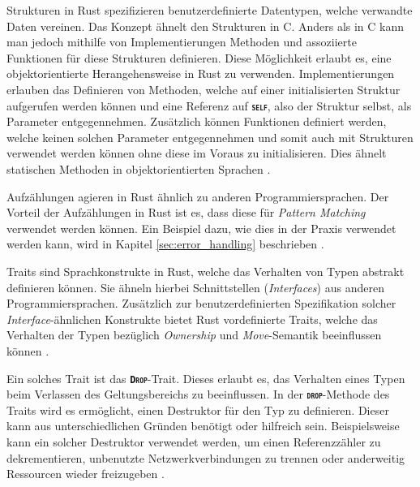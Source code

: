 Strukturen in Rust spezifizieren benutzerdefinierte Datentypen, welche verwandte Daten vereinen. Das Konzept
ähnelt den Strukturen in C. Anders als in C kann man jedoch mithilfe von Implementierungen Methoden und assoziierte
Funktionen für diese Strukturen definieren.
Diese Möglichkeit erlaubt es, eine objektorientierte Herangehensweise in Rust zu verwenden.
Implementierungen erlauben das Definieren von Methoden, welche auf einer initialisierten Struktur aufgerufen werden
können und eine Referenz auf \texttt{\textsc{\textbf{self}}}, also der Struktur selbst, als Parameter entgegennehmen.
Zusätzlich können Funktionen definiert werden, welche keinen solchen Parameter entgegennehmen und somit auch mit
Strukturen verwendet werden können ohne diese im Voraus zu initialisieren.
Dies ähnelt statischen Methoden in objektorientierten Sprachen \cite{rustBook}.

Aufzählungen agieren in Rust ähnlich zu anderen Programmiersprachen. Der Vorteil der Aufzählungen in Rust ist es,
dass diese für \textit{Pattern Matching} verwendet werden können.
Ein Beispiel dazu, wie dies in der Praxis verwendet
werden kann, wird in Kapitel \ref{sec:error_handling} beschrieben
\cite{rustBook}.

Traits sind Sprachkonstrukte in Rust, welche das Verhalten von Typen abstrakt definieren können. Sie ähneln 
hierbei Schnittstellen (\textit{Interfaces}) aus anderen Programmiersprachen.
Zusätzlich zur benutzerdefinierten Spezifikation
solcher \textit{Interface}-ähnlichen Konstrukte bietet Rust vordefinierte Traits, welche das Verhalten der Typen
bezüglich \textit{Ownership} und \textit{Move}-Semantik beeinflussen können \cite{rustBook}.

Ein solches Trait ist das \texttt{\textsc{\textbf{Drop}}}-Trait. Dieses erlaubt es, das Verhalten eines Typen beim Verlassen des
Geltungsbereichs zu beeinflussen. In der \texttt{\textsc{\textbf{drop}}}-Methode des Traits wird es ermöglicht, einen Destruktor
für den Typ zu definieren. Dieser kann aus unterschiedlichen Gründen benötigt oder hilfreich sein.
Beispielsweise kann ein solcher Destruktor verwendet werden,
um einen Referenzzähler zu dekrementieren, unbenutzte Netzwerkverbindungen
zu trennen oder anderweitig Ressourcen wieder freizugeben \cite{rustBook}.

